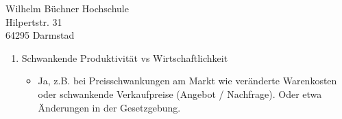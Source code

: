 \documentclass[
    version=last,           %
    DIV=13,                 %
    BCOR=0mm,               %
    paper=a4,               %
    fontsize=12pt,          %
    firsthead=on,           %
    firstfoot=on,           %
    pagenumber=on,i         %
    parskip=half,           %
    enlargefirstpage=,      %
    firsthead=on,           %
    fromrule=afteraddress,  %
    priority=off,           %
    backaddress=true,       %
    refline=dateright,      %
	fromalign=right,	    %
    fromemail=on,i          %
    fromurl=on,             %
    frombank=on,
    fromphone=on,           %
    frommobilephone=on      %
    fromlogo=on,            %
    addrfield=on,           %
    subject=untitled,  %
    foldmarks=off,          %
    numericaldate=off,      %
	pagenumber=right,	        %
	parskip=half,	        %
    headsep=false,          %
    footsepline=true,       %
    foldmarks=off,		    %
	]{scrlttr2}
\begin{document}
\begin{letter} {Wilhelm Büchner Hochschule \\
Hilpertstr. 31\\
64295 Darmstad}
\begin{enumerate}
\begin{enumerate}
\begin{itemize}
                        Gründung einer Rechtsform GmbH lassen sich die Kosten auf
                        \textbf{gesamt und fix} 25 Prozent bis 35 Prozent (anhängig
                        des U-Sitz und der Vertriebs- und Produktionsstätten). Die
                        Gründungskosten und Verwaltungskosten hätte er in nur einem
                        Monat durch Steuervorteil bereits gespart.
                    \item Sollten andere Lösungswege gewünscht sein, lautet
                        meine weitere Empfehlung: Geben Sie mir doch mehr Zahlen
                        als Rechengrundlage. :)
                \end{itemize}

            \item Schwankende Produktivität vs Wirtschaftlichkeit
                \begin{itemize}
                    \item Ja, z.B. bei Preisschwankungen am Markt wie veränderte
                        Warenkosten oder \newline schwankende Verkaufpreise
                        (Angebot / Nachfrage). Oder etwa Änderungen in der
                        Gesetzgebung.
                \end{itemize}

        \end{enumerate}


\end{enumerate}
\end{letter}
\end{document}

